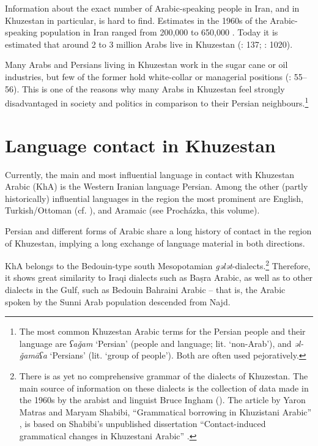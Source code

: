 \documentclass[output=paper,nonflat]{langsci/langscibook}
\begin{document}
Information about the exact number of Arabic-speaking people in Iran, and in Khuzestan in particular, is hard to find. Estimates in the 1960s of the Arabic-speaking population in Iran ranged from 200,000 to 650,000 \citep[216]{Oberling1986}. Today it is estimated that around 2 to 3 million Arabs live in Khuzestan (\citealt{MatrasShabibi2007}: 137; \citealt{Gazsi2011}: 1020). 

Many Arabs and Persians living in Khuzestan work in the sugar cane or oil industries, but few of the former hold white-collar or managerial positions (\citealt{DePlanhol1986}: 55–56). This is one of the reasons why many Arabs in Khuzestan feel strongly disadvantaged in society and politics in comparison to their Persian neighbours.\footnote{The most common Khuzestan Arabic terms for the Persian people and their language are \textit{ʕaǧam} ‘Persian' (people and language; lit. `non-Arab'), and \textit{əl-ǧamāʕa} ‘Persians’ (lit. `group of people'). Both are often used pejoratively.} 

\section{Language contact in Khuzestan}

Currently, the main and most influential language in contact with Khuzestan Arabic (KhA) is the Western Iranian language Persian. Among the other (partly historically) influential languages in the region the most prominent are English, Turkish/Ottoman (cf. \citealt{Ingham2005}), and Aramaic (see Procházka, this volume).

Persian and different forms of Arabic share a long history of contact in the region of Khuzestan, implying a long exchange of language material in both directions. 

KhA belongs to the Bedouin-type south Mesopotamian \textit{gələt}-dialects.\footnote{There is as yet no comprehensive grammar of the dialects of Khuzestan. The main source of information on these dialects is the collection of data made in the 1960s by the arabist and linguist Bruce Ingham (\citeyear{Ingham1973,Ingham1976,Ingham2011khuz}). The article by Yaron Matras and Maryam Shabibi, “Grammatical borrowing in Khuzistani Arabic” \citep{MatrasShabibi2007}, is based on Shabibi’s unpublished dissertation “Contact-induced grammatical changes in Khuzestani Arabic” \citep{Shabibi2006}.} Therefore, it shows great similarity to Iraqi dialects such as Baṣra Arabic, as well as to other dialects in the Gulf, such as Bedouin Bahraini Arabic – that is, the Arabic spoken by the Sunni Arab population descended from Najd. 
\end{document}
